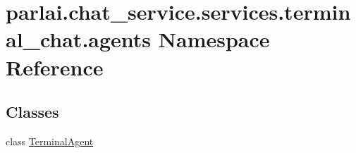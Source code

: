 \hypertarget{namespaceparlai_1_1chat__service_1_1services_1_1terminal__chat_1_1agents}{}\section{parlai.\+chat\+\_\+service.\+services.\+terminal\+\_\+chat.\+agents Namespace Reference}
\label{namespaceparlai_1_1chat__service_1_1services_1_1terminal__chat_1_1agents}
\subsection*{Classes}
\begin{DoxyCompactItemize}
\item 
class \hyperlink{classparlai_1_1chat__service_1_1services_1_1terminal__chat_1_1agents_1_1TerminalAgent}{Terminal\+Agent}
\end{DoxyCompactItemize}
